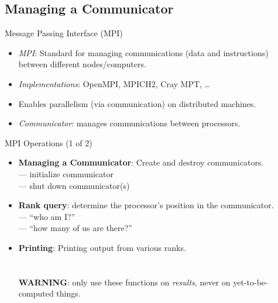 \subsection{Managing a Communicator}

\begin{frame}
  \begin{block}{Message Passing Interface (MPI)}\pause
    \begin{itemize}
      \item \textit{MPI}: Standard for managing communications (data and instructions) between 
different nodes/computers.
      \item \textit{Implementations}:  OpenMPI, MPICH2, Cray MPT, \dots
      \item Enables parallelism (via communication) on distributed machines.
      \item \textit{Communicator}: manages communications between processors.
    \end{itemize}
  \end{block}
\end{frame}


\begin{frame}
  \begin{block}{MPI Operations (1 of 2)}\pause
    \begin{itemize}
      \item \textbf{Managing a Communicator}:  Create and destroy communicators.\\
       --- initialize communicator\\
       --- shut down communicator(s)
      \\[.4cm]
      \item \textbf{Rank query}: determine the processor's position in the communicator.\\
       --- ``who am I?''\\
       --- ``how many of us are there?''\\[.4cm]
      \item \textbf{Printing}:  Printing output from various ranks.\\
      \\
      \\
      \textbf{WARNING}: only use these functions on \emph{results}, never on yet-to-be-computed 
things.\\
    \end{itemize}
  \end{block}
\end{frame}


